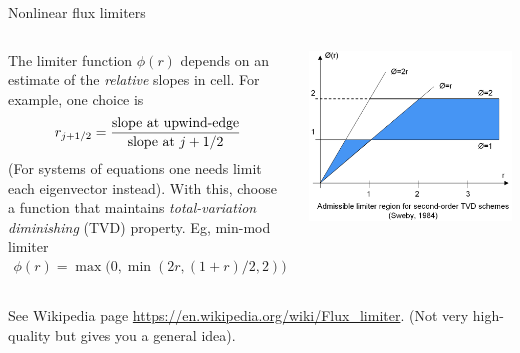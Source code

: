 \documentclass[aspectratio=169]{beamer}
\begin{document}
\begin{frame}{Nonlinear flux limiters}
  \small
  \begin{columns}
    \begin{column}{0.5\linewidth}
      The limiter function $\phi(r)$ depends on an estimate of the
      \emph{relative} slopes in cell. For example, one choice is
      \begin{align*}
        r_{j+1/2} = \frac{\textrm{\textrm{slope at upwind-edge}}}{\textrm{slope at } j+1/2}
      \end{align*}
      (For systems of equations one needs limit each eigenvector
      instead). With this, choose a function that maintains
      \emph{total-variation diminishing} (TVD) property. Eg, min-mod
      limiter
      \begin{align*}
        \phi(r) = \max\big(0, \min(2r, (1+r)/2,2) \big).
      \end{align*}
    \end{column}
    
    \begin{column}{0.5\linewidth}
      \includegraphics[width=\linewidth]{LimiterRegion.png}
    \end{column}
  \end{columns}
  See Wikipedia page
  \url{https://en.wikipedia.org/wiki/Flux_limiter}. (Not very
  high-quality but gives you a general idea).
\end{frame}
\end{document}
